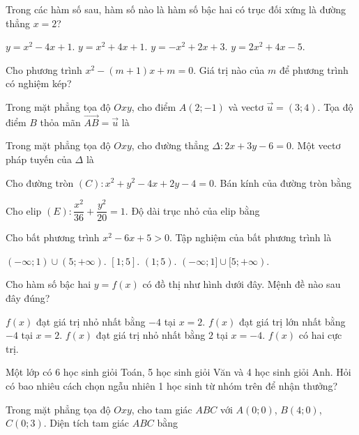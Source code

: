 
\NQuestion Trong các hàm số sau, hàm số nào là hàm số bậc hai có trục đối xứng là đường thẳng $x=2$?

\ChoicesTwoLines
{$y=x^2-4x+1$.}
{$y=x^2+4x+1$.}
{$y=-x^2+2x+3$.}
{$y=2x^2+4x-5$.}

\NQuestion Cho phương trình $x^2-(m+1)x+m=0$. Giá trị nào của $m$ để phương trình có nghiệm kép?


\NQuestion Trong mặt phẳng tọa độ $Oxy$, cho điểm $A(2;-1)$ và vectơ $\vec u=(3;4)$. Tọa độ điểm $B$ thỏa mãn $\overrightarrow{AB}=\vec u$ là


\NQuestion Trong mặt phẳng tọa độ $Oxy$, cho đường thẳng $\Delta:2x+3y-6=0$. Một vectơ pháp tuyến của $\Delta$ là


\NQuestion Cho đường tròn $(C):x^2+y^2-4x+2y-4=0$. Bán kính của đường tròn bằng


\NQuestion Cho elip $(E):\dfrac{x^2}{36}+\dfrac{y^2}{20}=1$. Độ dài trục nhỏ của elip bằng


\NQuestion Cho bất phương trình $x^2-6x+5>0$. Tập nghiệm của bất phương trình là

\ChoicesTwoLines
{$(-\infty;1)\cup(5;+\infty)$.}
{$[1;5]$.}
{$(1;5)$.}
{$(-\infty;1]\cup[5;+\infty)$.}

\NQuestion Cho hàm số bậc hai $y=f\left(x\right)$ có đồ thị như hình dưới đây. Mệnh đề nào sau đây đúng?

\begin{center}

\end{center}

\ChoicesTwoLines
{$f\left(x\right)$ đạt giá trị nhỏ nhất bằng $-4$ tại $x=2$.}
{$f\left(x\right)$ đạt giá trị lớn nhất bằng $-4$ tại $x=2$.}
{$f\left(x\right)$ đạt giá trị nhỏ nhất bằng $2$ tại $x=-4$.}
{$f\left(x\right)$ có hai cực trị.}

\NQuestion Một lớp có 6 học sinh giỏi Toán, 5 học sinh giỏi Văn và 4 học sinh giỏi Anh. Hỏi có bao nhiêu cách chọn ngẫu nhiên 1 học sinh từ nhóm trên để nhận thưởng?


\NQuestion Trong mặt phẳng tọa độ $Oxy$, cho tam giác $ABC$ với $A(0;0)$, $B(4;0)$, $C(0;3)$. Diện tích tam giác $ABC$ bằng


